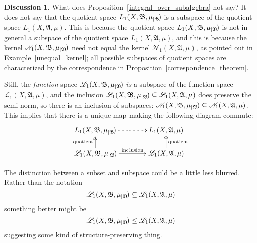 \documentclass[
twoside=true,
paper=letter,
fontsize=9pt,
pagesize=auto,
leqno,
openany,
headsepline,
overfullrule,
]{scrbook}
\theoremstyle{plain}
\theoremstyle{plain}
\theoremstyle{definition}
\newtheorem{discussion}[thm]{Discussion}
\theoremstyle{bfnoteitalic}
\theoremstyle{bfnoteroman}
\newcommand{\sigalg}[1]{\mathfrak{#1}}
\newcommand{\cali}[1]{\mathscr{#1}}
\newcommand{\restrictedto}[1]{_{\lvert#1}\kern-1.5pt}
\newcommand{\sigmaalgebra}{\sigalg{A}}
\newcommand{\sigmaalgebraii}{\sigalg{B}}
\newcommand{\measurespace}{X}
\newcommand{\measure}{\mu}
\begin{document}
\begin{discussion}\label{L1_subspace_embedding}
What does Proposition~\ref{integral_over_subalgebra} not say?
It does not say that the quotient space $L_1(\measurespace, \sigmaalgebraii, \measure\restrictedto{\sigmaalgebraii})$
is a subspace of the quotient space 
$L_1(\measurespace, \sigmaalgebra, \measure)$.  This is because the quotient space $L_1(\measurespace, \sigmaalgebraii, \measure\restrictedto{\sigmaalgebraii})$
is not in general a subspace of the quotient space 
$L_1(\measurespace, \sigmaalgebra, \measure)$, 
and this is because the kernel
$\cali{N}_1(\measurespace, \sigmaalgebraii, \measure\restrictedto{\sigmaalgebraii})$
need not equal the kernel
$\cali{N}_1(\measurespace, \sigmaalgebra, \measure)$,
as pointed out in 
Example~\ref{unequal_kernel};
all possible subspaces of quotient spaces are characterized by the correspondence 
in Proposition~\ref{correspondence_theorem}.

Still, the \emph{function} space
$\cali{L}_1(\measurespace, \sigmaalgebraii, \measure\restrictedto{\sigmaalgebraii})$
\emph{is} a subspace of the function space
$\cali{L}_1(\measurespace, \sigmaalgebra, \measure)$,
and the inclusion 
$\cali{L}_1(\measurespace, \sigmaalgebraii, \measure\restrictedto{\sigmaalgebraii})
\subseteq
\cali{L}_1(\measurespace, \sigmaalgebra, \measure)$
does preserve the semi-norm, so there is an inclusion of subspaces: 
$\cali{N}_1(\measurespace, \sigmaalgebraii, \measure\restrictedto{\sigmaalgebraii})
\subseteq
\cali{N}_1(\measurespace, \sigmaalgebra, \measure)$. This implies that
there is a unique map making the following diagram commute:
\[
\xymatrix@R=16pt@C=38pt{ 
L_1(\measurespace, \sigmaalgebraii, \measure\restrictedto{\sigmaalgebraii})
\ar@{.>}[r]
&
L_1(\measurespace, \sigmaalgebra, \measure)
\\
\cali{L}_1(\measurespace, \sigmaalgebraii, \measure\restrictedto{\sigmaalgebraii}) \ar[r]^-{\text{inclusion}} 
\ar@{->>}[u]^{\text{quotient}}
&
\cali{L}_1(\measurespace, \sigmaalgebra, \measure)
\ar@{->>}[u]_{\text{quotient}}
}
\]
\end{discussion}






\label{subset_vs_subspace}
\begin{quoting}
\small
The distinction between a subset and subspace could be a little less blurred.  Rather than the notation 
\[
\cali{L}_1(\measurespace, \sigmaalgebraii, \measure\restrictedto{\sigmaalgebraii})
\subseteq
\cali{L}_1(\measurespace, \sigmaalgebra, \measure)
\]
something better might be
\[
\cali{L}_1(\measurespace, \sigmaalgebraii, \measure\restrictedto{\sigmaalgebraii})
\leq
\cali{L}_1(\measurespace, \sigmaalgebra, \measure)
\]
suggesting some kind of structure-preserving thing.
\end{quoting}
\end{document}

